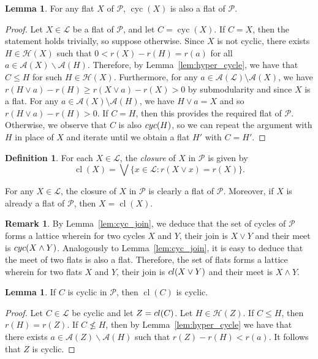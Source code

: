 \documentclass[a4paper,11pt,reqno]{article}
\theoremstyle{definition}
\newtheorem{definition}[theorem]{{{Definition}}}
\newtheorem{remark}[theorem]{{{Remark}}}
\newtheorem{lemma}[theorem]{{{Lemma}}}
\newcommand{\mL}{\mathcal{L}}
\newcommand{\mP}{\mathcal{P}}
\newcommand{\mA}{\mathcal{A}}
\newcommand{\mH}{\mathcal{H}}
\DeclareMathOperator{\cyc}{cyc}
\DeclareMathOperator{\cl}{cl}
\begin{document}
\begin{lemma}\label{lem:cyc(F)_is_also_flat}
    For any flat $X$ of $\mP$, $\cyc(X)$ is also a flat of $\mP$. 
\end{lemma}

\begin{proof}
    Let $X\in\mathcal{L}$ be a flat of $\mP$, and let $C=\cyc(X)$. If $C=X$, then the statement holds trivially, so suppose otherwise. Since $X$ is not cyclic, there exists $H \in \mH(X)$ such that $0<r(X)-r(H)=r(a)$ for all $a\in \mathcal{A}(X)\backslash\mathcal{A}(H)$. Therefore, by Lemma~\ref{lem:hyper_cycle}, we have that $C\leq H$ for such $H \in \mH(X)$. Furthermore, for any $a\in\mathcal{A}(\mathcal{L})\setminus\mathcal{A}(X)$, we have $r(H\vee a)-r(H)\geq r(X\vee a)-r(X)>0$ by submodularity and since $X$ is a flat. For any $a\in\mathcal{A}(X)\setminus\mathcal{A}(H)$, we have $H\vee a=X$ and so $r(H\vee a)-r(H)>0$. If $C=H$, then this provides the required flat of $\mP$. Otherwise, we observe that $C$ is also $\textup{cyc}(H)$, so we can repeat the argument with $H$ in place of $X$ and iterate until we obtain a flat $H'$ with $C=H'$.
\end{proof}

\begin{definition}\label{def:closure_function}
    For each $X\in\mathcal{L}$, the {\em closure} of $X$ in $\mP$ is given by
    $$\cl(X)=\bigvee\{x\in\mathcal{L}:r(X\vee x)=r(X)\}.$$\end{definition}

For any $X \in \mL$, the closure of $X$ in $\mP$ is clearly a flat of $\mP$. Moreover, if $X$ is already a flat of $\mP$, then $X = \cl(X)$. 

\begin{remark}
    By Lemma~\ref{lem:cyc_join}, we deduce that the set of cycles of $\mathcal{P}$ forms a lattice wherein for two cycles $X$ and $Y$, their join is $X\vee Y$ and their meet is $\textup{cyc}(X\wedge Y)$. Analogously to Lemma~\ref{lem:cyc_join}, it is easy to deduce that the meet of two flats is also a flat. Therefore, the set of flats forms a lattice wherein for two flats $X$ and $Y$, their join is $\textup{cl}(X\vee Y)$ and their meet is $X\wedge Y$.
\end{remark}

\begin{lemma}\label{lem:closure_of_cyc_space_is_cyclic}
    If $C$ is cyclic in $\mP$, then $\cl(C)$ is cyclic.
\end{lemma}

\begin{proof}
    Let $C\in\mathcal{L}$ be cyclic and let $Z=\textup{cl}(C)$. Let $H\in\mH(Z)$. If $C\leq H$, then $r(H)=r(Z)$. If $C\nleq H$, then by Lemma~\ref{lem:hyper_cycle} we have that
    there exists $a \in \mA(Z) \backslash \mA(H)$ such that $r(Z)-r(H)<r(a)$. It follows that $Z$ is cyclic.
\end{proof}
\end{document}

